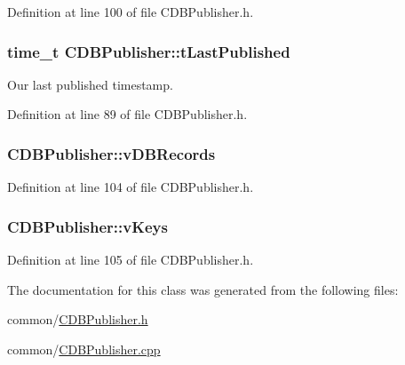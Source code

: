 \-Definition at line 100 of file \-C\-D\-B\-Publisher.\-h.

\hypertarget{class_c_d_b_publisher_a2cf425adefacf57d8ab03b3c77a7de8c}{
\subsubsection[{t\-Last\-Published}]{\setlength{\rightskip}{0pt plus 5cm}time\-\_\-t {\bf \-C\-D\-B\-Publisher\-::t\-Last\-Published}}}\label{class_c_d_b_publisher_a2cf425adefacf57d8ab03b3c77a7de8c}


\-Our last published timestamp. 



\-Definition at line 89 of file \-C\-D\-B\-Publisher.\-h.

\hypertarget{class_c_d_b_publisher_af3c16b9ccfd3d1df26c1ebf91bd6a987}{
\subsubsection[{v\-D\-B\-Records}]{ {\bf \-C\-D\-B\-Publisher\-::v\-D\-B\-Records}}}\label{class_c_d_b_publisher_af3c16b9ccfd3d1df26c1ebf91bd6a987}


\-Definition at line 104 of file \-C\-D\-B\-Publisher.\-h.

\hypertarget{class_c_d_b_publisher_a05607846e2fc5c63010536113ca2534e}{
\subsubsection[{v\-Keys}]{ {\bf \-C\-D\-B\-Publisher\-::v\-Keys}}}\label{class_c_d_b_publisher_a05607846e2fc5c63010536113ca2534e}


\-Definition at line 105 of file \-C\-D\-B\-Publisher.\-h.



\-The documentation for this class was generated from the following files\-:\begin{DoxyCompactItemize}
\item 
common/\hyperlink{_c_d_b_publisher_8h}{\-C\-D\-B\-Publisher.\-h}\item 
common/\hyperlink{_c_d_b_publisher_8cpp}{\-C\-D\-B\-Publisher.\-cpp}\end{DoxyCompactItemize}
